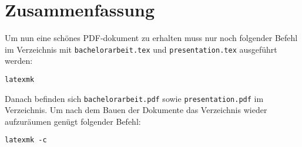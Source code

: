 
\chapter{Zusammenfassung}
\label{chap:Zusammenfassung}
Um nun eine schönes PDF-dokument zu erhalten muss nur noch folgender Befehl im Verzeichnis mit \texttt{bachelorarbeit.tex} und \texttt{presentation.tex}
ausgeführt werden:

\begin{verbatim}
latexmk
\end{verbatim}

Danach befinden sich \texttt{bachelorarbeit.pdf} sowie \texttt{presentation.pdf} im Verzeichnis. Um nach dem Bauen der Dokumente das Verzeichnis wieder
aufzuräumen genügt folgender Befehl:

\begin{verbatim}
latexmk -c
\end{verbatim}
